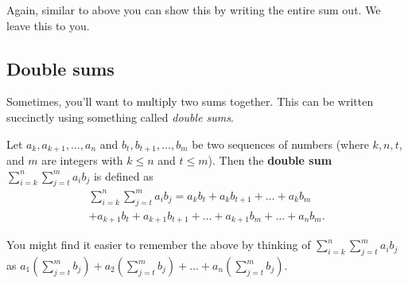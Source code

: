 \documentclass[
  12pt,
  a4paper, oneside]{starmastarticle}
\begin{document}
Again, similar to above you can show this by writing the entire sum out.
We leave this to you.

\begin{tcolorbox}[enhanced jigsaw, arc=.35mm, colframe=quarto-callout-note-color-frame, rightrule=.15mm, bottomrule=.15mm, toprule=.15mm, leftrule=.75mm, left=2mm, opacityback=0, colback=white, breakable]
\begin{minipage}[t]{5.5mm}
\textcolor{quarto-callout-note-color}{\faInfo}
\end{minipage}%
\begin{minipage}[t]{\textwidth - 5.5mm}

\end{minipage}%
\end{tcolorbox}

\hypertarget{double-sums}{%
\subsection{Double sums}\label{double-sums}}

Sometimes, you'll want to multiply two sums together. This can be
written succinctly using something called \emph{double sums}.

\begin{tcolorbox}[enhanced jigsaw, arc=.35mm, colframe=quarto-callout-note-color-frame, rightrule=.15mm, bottomrule=.15mm, toprule=.15mm, leftrule=.75mm, left=2mm, opacityback=0, colback=white, breakable]
\begin{minipage}[t]{5.5mm}
\textcolor{quarto-callout-note-color}{\faInfo}
\end{minipage}%
\begin{minipage}[t]{\textwidth - 5.5mm}
Let \(a_{k},a_{k+1},\ldots,a_n\) and \(b_t,b_{t+1},\ldots,b_m\) be two
sequences of numbers (where \(k,n,t\), and \(m\) are integers with
\(k \leq n\) and \(t \leq m\)). Then the \textbf{double sum}
\(\sum_{i=k}^n\sum_{j=t}^m a_i b_j\) is defined as
\[\begin{multline*} \sum_{i=k}^n\sum_{j=t}^m a_i b_j = a_kb_t + a_kb_{t+1} + \ldots + a_kb_m \\+ a_{k+1}b_t + a_{k+1}b_{t+1} + \ldots + a_{k+1}b_m + \ldots + a_nb_m.\end{multline*}\]\end{minipage}%
\end{tcolorbox}

\begin{tcolorbox}[enhanced jigsaw, colframe=quarto-callout-tip-color-frame, coltitle=black, left=2mm, opacityback=0, breakable, colbacktitle=quarto-callout-tip-color!10!white, bottomtitle=1mm, toptitle=1mm, titlerule=0mm, title=\textcolor{quarto-callout-tip-color}{\faLightbulb}\hspace{0.5em}{Tip}, toprule=.15mm, rightrule=.15mm, bottomrule=.15mm, arc=.35mm, leftrule=.75mm, opacitybacktitle=0.6, colback=white]
You might find it easier to remember the above by thinking of
\(\sum_{i=k}^n\sum_{j=t}^m a_i b_j\) as
\(a_1(\sum_{j=t}^mb_j) + a_2(\sum_{j=t}^mb_j) + \ldots + a_n(\sum_{j=t}^mb_j).\)
\end{tcolorbox}
\end{document}
